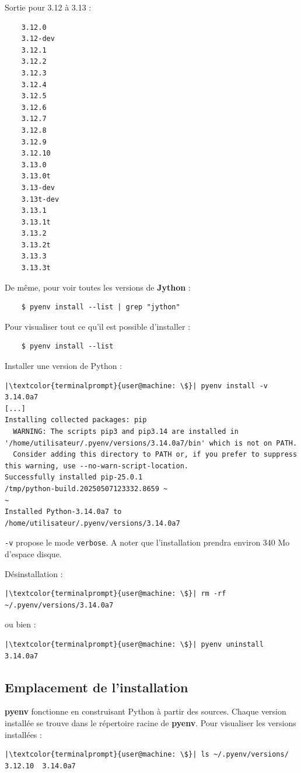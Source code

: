 Sortie pour 3.12 à 3.13 :
\begin{verbatim}
    3.12.0
    3.12-dev
    3.12.1
    3.12.2
    3.12.3
    3.12.4
    3.12.5
    3.12.6
    3.12.7
    3.12.8
    3.12.9
    3.12.10
    3.13.0
    3.13.0t
    3.13-dev
    3.13t-dev
    3.13.1
    3.13.1t
    3.13.2
    3.13.2t
    3.13.3
    3.13.3t
\end{verbatim}

De même, pour voir toutes les versions de \textbf{Jython} :
\begin{verbatim}
    $ pyenv install --list | grep "jython"
\end{verbatim}

Pour visualiser tout ce qu'il est possible d'installer :
\begin{verbatim}
    $ pyenv install --list
\end{verbatim}

Installer une version de Python :
\begin{lstlisting}[style=terminal]
|\textcolor{terminalprompt}{user@machine: \$}| pyenv install -v 3.14.0a7
[...]
Installing collected packages: pip
  WARNING: The scripts pip3 and pip3.14 are installed in '/home/utilisateur/.pyenv/versions/3.14.0a7/bin' which is not on PATH.
  Consider adding this directory to PATH or, if you prefer to suppress this warning, use --no-warn-script-location.
Successfully installed pip-25.0.1
/tmp/python-build.20250507123332.8659 ~
~
Installed Python-3.14.0a7 to /home/utilisateur/.pyenv/versions/3.14.0a7
\end{lstlisting}

\texttt{-v} propose le mode \texttt{verbose}. A noter que l'installation prendra environ 340 Mo d'espace disque.

Désinstallation :
\begin{lstlisting}[style=terminal]
|\textcolor{terminalprompt}{user@machine: \$}| rm -rf ~/.pyenv/versions/3.14.0a7
\end{lstlisting}

ou bien :
\begin{lstlisting}[style=terminal]
|\textcolor{terminalprompt}{user@machine: \$}| pyenv uninstall 3.14.0a7
\end{lstlisting}

\subsection*{Emplacement de l'installation}
\textbf{pyenv} fonctionne en construisant Python à partir des sources. Chaque version installée se trouve dans le répertoire racine de \textbf{pyenv}. Pour visualiser les versions installées :
\begin{lstlisting}[style=terminal]
|\textcolor{terminalprompt}{user@machine: \$}| ls ~/.pyenv/versions/
3.12.10  3.14.0a7
\end{lstlisting}

